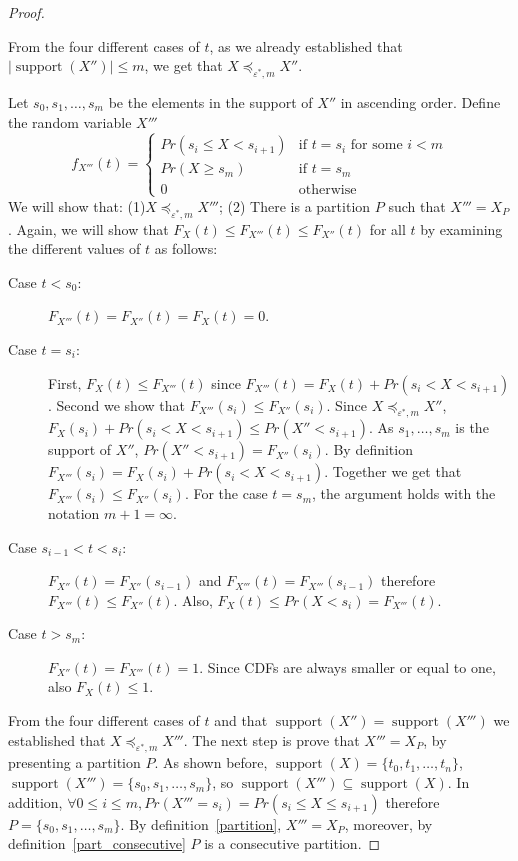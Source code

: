 \documentclass[review]{elsarticle}
\DeclareMathOperator{\supp}{support}
\DeclareMathOperator{\support}{support}
\begin{document}
\begin{proof}
\begin{description}
\end{description}
From the four different cases of $t$, as we already established that $|\supp(X'')|\leq m$, we get that $X \preceq_{\varepsilon^*,m} X''$. 

Let $s_0,s_1,\dots,s_m$ be the elements in the support of $X''$ in ascending order. Define the random variable $X'''$
$$
f_{X'''}(t) = \begin{cases}
Pr(s_{i} \leq X < s_{i+1}) & \text{if } t=s_i \text{ for some } i < m \\ 
Pr(X \geq s_m)           & \text{if } t=s_m  \\ 
0                        & \text{otherwise}
\end{cases}
$$
We will show that: (1)$X \preceq_{\varepsilon^*,m} X'''$; (2) There is a partition $P$ such that $X'''=X_P$. 
Again, we will show that $F_{X}(t) \leq  F_{X'''}(t) \leq F_{X''}(t)$ for all $t$ by examining the different values of $t$ as follows: 
\begin{description}
\item[Case $t < s_0$:] $F_{X'''}(t)=F_{X''}(t)=F_{X}(t)=0$. 
\item[Case $t=s_i$:] First, $F_{X}(t) \leq F_{X'''}(t)$ since $F_{X'''}(t) = F_{X}(t)+Pr(s_{i} < X < s_{i+1})$.
Second we show that  $F_{X'''}(s_i) \leq F_{X''}(s_i)$. Since $X \preceq_{\varepsilon^*,m} X''$, $F_X(s_i) + Pr(s_i < X < s_{i+1}) \leq  Pr(X''<s_{i+1})$. As $s_1,\dots,s_m$ is the support of $X''$, $Pr(X''<s_{i+1}) = F_{X''}(s_i)$. By definition $F_{X'''}(s_i) = F_X(s_i) + Pr(s_i < X < s_{i+1})$. Together we get that $F_{X'''}(s_i) \leq F_{X''}(s_i)$. For the case $t=s_m$, the argument holds with the notation $m+1=\infty$. 

\item[Case $s_{i-1} < t < s_i$:] $F_{X''}(t)= F_{X''}(s_{i-1})$ and $F_{X'''}(t)= F_{X'''}(s_{i-1})$ therefore $F_{X'''}(t) \leq F_{X''}(t)$. Also, $F_X(t) \leq Pr(X<s_i) = F_{X'''}(t)$.
\item[Case $t > s_m$:] $F_{X''}(t)= F_{X'''}(t)=1$. Since CDFs are always smaller or equal to one, also $F_{X}(t)\leq1$. 
\end{description}
From the four different cases of $t$ and that $\supp(X'')=\supp(X''')$ we established that $X \preceq_{\varepsilon^*,m} X'''$. 
The next step is prove that $X'''=X_P$, by presenting a partition $P$. As shown before, $\support(X)=\{t_0,t_1,\dots,t_n\}$,  $\support(X''')=\{s_0,s_1,\dots,s_m\}$, so $\support(X''')\subseteq \support(X)$. In addition, $\forall 0\leq i\leq m, Pr(X'''=s_i) = Pr(s_i \leq X \leq s_{i+1})$ therefore $P = \{s_0,s_1,\dots,s_m\}$.
By definition~\ref{partition}, $X'''=X_P$, moreover, by definition~\ref{part_consecutive} $P$ is a consecutive partition.
\end{proof}
\end{document}
